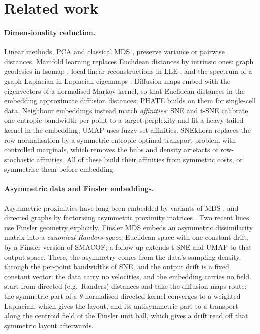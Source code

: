 \section{Related work}
\label{sec:related}

\paragraph{Dimensionality reduction.}
Linear methods, PCA \citep{pearson1901pca} and classical MDS
\citep{torgerson1952mds}, preserve variance or pairwise distances.
Manifold learning replaces Euclidean distances by intrinsic ones: graph
geodesics in Isomap \citep{tenenbaum2000global}, local linear
reconstructions in LLE \citep{roweis2000lle}, and the spectrum of a graph
Laplacian in Laplacian eigenmaps \citep{belkin2003laplacian}. Diffusion
maps \citep{coifman2006diffusion} embed with the eigenvectors of a
normalised Markov kernel, so that Euclidean distances in the embedding
approximate diffusion distances; PHATE \citep{moon2019phate} builds on
them for single-cell data. Neighbour embeddings instead match
\emph{affinities}: SNE and t-SNE
\citep{hinton2002sne,vandermaaten2008tsne} calibrate one entropic
bandwidth per point to a target perplexity
\citep{vladymyrov2013entropic} and fit a heavy-tailed kernel in the
embedding; UMAP \citep{mcinnes2018umap} uses fuzzy-set affinities.
SNEkhorn \citep{vanassel2023snekhorn} replaces the row normalisation by
a symmetric entropic optimal-transport problem with controlled marginals,
which removes the hubs and density artefacts of row-stochastic
affinities. All of these build their affinities from symmetric costs, or
symmetrise them before embedding.

\paragraph{Asymmetric data and Finsler embeddings.}
Asymmetric proximities have long been embedded by variants of MDS
\citep{okada1987asymmetric}, and directed graphs by factorising
asymmetric proximity matrices \citep{ou2016hope}. Two recent lines use
Finsler geometry explicitly. Finsler MDS \citep{dages2025finsler}
embeds an asymmetric dissimilarity matrix into a \emph{canonical Randers
space}, Euclidean space with one constant drift, by a Finsler version of
SMACOF; a follow-up \citep{dages2026harnessing} extends t-SNE and UMAP to
that output space. There, the asymmetry comes from the data's sampling
density, through the per-point bandwidths of SNE, and the output drift
is a fixed constant vector: the data carry no velocities, and the
embedding carries no field. \citet{debaussart2026finslerian} start from
directed (e.g.\ Randers) distances and take the diffusion-maps route:
the symmetric part of a $\theta$-normalised directed kernel converges to
a weighted Laplacian, which gives the layout, and its antisymmetric part
to a transport along the centroid field of the Finsler unit ball, which
gives a drift read off that symmetric layout afterwards.

